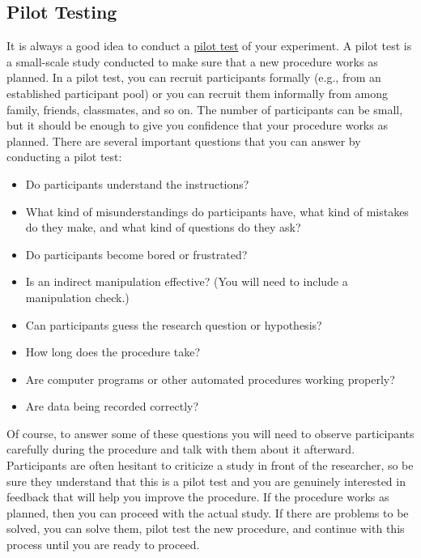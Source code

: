 \documentclass[
]{krantz}
\providecommand{\tightlist}{%
  \setlength{\itemsep}{0pt}\setlength{\parskip}{0pt}}
\begin{document}
\hypertarget{pilot-testing}{%
\subsection*{Pilot Testing}\label{pilot-testing}}


It is always a good idea to conduct a \protect\hyperlink{pilot-test}{pilot test} of your experiment. A pilot test is a small-scale study conducted to make sure that a new procedure works as planned. In a pilot test, you can recruit participants formally (e.g., from an established participant pool) or you can recruit them informally from among family, friends, classmates, and so on. The number of participants can be small, but it should be enough to give you confidence that your procedure works as planned. There are several important questions that you can answer by conducting a pilot test:

\begin{itemize}
\tightlist
\item
  Do participants understand the instructions?
\item
  What kind of misunderstandings do participants have, what kind of mistakes do they make, and what kind of questions do they ask?
\item
  Do participants become bored or frustrated?
\item
  Is an indirect manipulation effective? (You will need to include a manipulation check.)
\item
  Can participants guess the research question or hypothesis?
\item
  How long does the procedure take?
\item
  Are computer programs or other automated procedures working properly?
\item
  Are data being recorded correctly?
\end{itemize}

Of course, to answer some of these questions you will need to observe participants carefully during the procedure and talk with them about it afterward. Participants are often hesitant to criticize a study in front of the researcher, so be sure they understand that this is a pilot test and you are genuinely interested in feedback that will help you improve the procedure. If the procedure works as planned, then you can proceed with the actual study. If there are problems to be solved, you can solve them, pilot test the new procedure, and continue with this process until you are ready to proceed.
\end{document}
